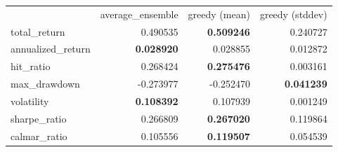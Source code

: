 \begin{tabular}{lrrr}
 & average_ensemble & greedy (mean) & greedy (stddev) \\
total_return & 0.490535 & \bfseries 0.509246 & 0.240727 \\
annualized_return & \bfseries 0.028920 & 0.028855 & 0.012872 \\
hit_ratio & 0.268424 & \bfseries 0.275476 & 0.003161 \\
max_drawdown & -0.273977 & -0.252470 & \bfseries 0.041239 \\
volatility & \bfseries 0.108392 & 0.107939 & 0.001249 \\
sharpe_ratio & 0.266809 & \bfseries 0.267020 & 0.119864 \\
calmar_ratio & 0.105556 & \bfseries 0.119507 & 0.054539 \\
\end{tabular}
